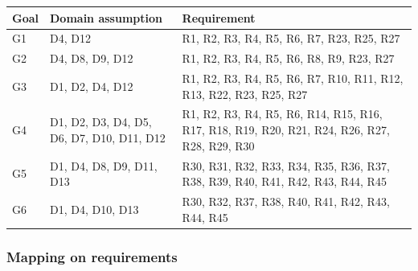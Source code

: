 \documentclass[11pt]{article}
\begin{document}
\begin{table}[H]
    \centering
    \setlength{\tabcolsep}{18pt}
    \renewcommand{\arraystretch}{1.2}
    \begin{tabularx}{\textwidth}{|>{\hsize=0.4\hsize}X|>{\hsize=1\hsize}X|>{\hsize=1.6\hsize}X|}
        \hline
        \textbf{Goal} & \textbf{Domain assumption} & \textbf{Requirement} \\
        \hline
        G1 & D4, D12 & R1, R2, R3, R4, R5, R6, R7, R23, R25, R27 \\ %
        \hline
        G2 & D4, D8, D9, D12 & R1, R2, R3, R4, R5, R6, R8, R9, R23, R27 \\ %
        \hline
        G3 & D1, D2, D4, D12 & R1, R2, R3, R4, R5, R6, R7, R10, R11, R12, R13, R22, R23, R25, R27 \\ %
        \hline
        G4 & D1, D2, D3, D4, D5, D6, D7, D10, D11, D12 & R1, R2, R3, R4, R5, R6, R14, R15, R16, R17, R18, R19, R20, R21, R24, R26, R27, R28, R29, R30 \\ %
        \hline
        G5 & D1, D4, D8, D9, D11, D13 & R30, R31, R32, R33, R34, R35, R36, R37, R38, R39, R40, R41, R42, R43, R44, R45 \\ %
        \hline
        G6 & D1, D4, D10, D13 & R30, R32, R37, R38, R40, R41, R42, R43, R44, R45 \\ %
        \hline
    \end{tabularx}
    \label{tab:requirementsMapping}
\end{table}

\subsubsection{Mapping on requirements}
\end{document}

